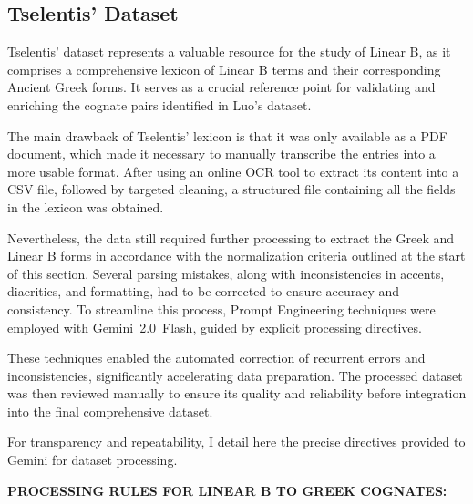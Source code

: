 \subsection{Tselentis' Dataset}
Tselentis' dataset represents a valuable resource for the study of Linear B, as it comprises a comprehensive lexicon of Linear B terms and their corresponding Ancient Greek forms.
It serves as a crucial reference point for validating and enriching the cognate pairs identified in Luo's dataset.

The main drawback of Tselentis' lexicon is that it was only available as a PDF document, which made it necessary to manually transcribe the entries into a more usable format.
After using an online OCR tool to extract its content into a CSV file, followed by targeted cleaning, a structured file containing all the fields in the lexicon was obtained.

Nevertheless, the data still required further processing to extract the Greek and Linear B forms in accordance with the normalization criteria outlined at the start of this section.
Several parsing mistakes, along with inconsistencies in accents, diacritics, and formatting, had to be corrected to ensure accuracy and consistency.
To streamline this process, Prompt Engineering techniques were employed with Gemini~2.0~Flash, guided by explicit processing directives.

These techniques enabled the automated correction of recurrent errors and inconsistencies, significantly accelerating data preparation.
The processed dataset was then reviewed manually to ensure its quality and reliability before integration into the final comprehensive dataset.

For transparency and repeatability, I detail here the precise directives provided to Gemini for dataset processing.

\bigskip
\noindent\textbf{PROCESSING RULES FOR LINEAR B TO GREEK COGNATES:}

